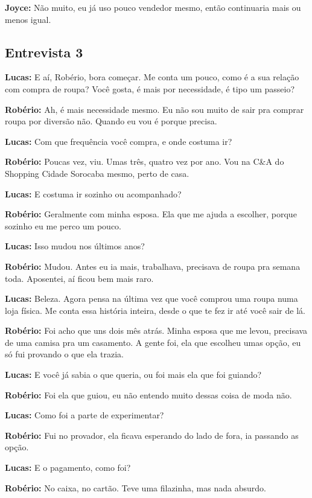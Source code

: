 \textbf{Joyce:} Não muito, eu já uso pouco vendedor mesmo, então continuaria mais ou menos igual.


\subsection*{Entrevista 3}

\textbf{Lucas:} E aí, Robério, bora começar. Me conta um pouco, como é a sua relação com compra de roupa? Você gosta, é mais por necessidade, é tipo um passeio?

\textbf{Robério:} Ah, é mais necessidade mesmo. Eu não sou muito de sair pra comprar roupa por diversão não. Quando eu vou é porque precisa.

\textbf{Lucas:} Com que frequência você compra, e onde costuma ir?

\textbf{Robério:} Poucas vez, viu. Umas três, quatro vez por ano. Vou na C\&A do Shopping Cidade Sorocaba mesmo, perto de casa.

\textbf{Lucas:} E costuma ir sozinho ou acompanhado?

\textbf{Robério:} Geralmente com minha esposa. Ela que me ajuda a escolher, porque sozinho eu me perco um pouco.

\textbf{Lucas:} Isso mudou nos últimos anos?

\textbf{Robério:} Mudou. Antes eu ia mais, trabalhava, precisava de roupa pra semana toda. Aposentei, aí ficou bem mais raro.

\textbf{Lucas:} Beleza. Agora pensa na última vez que você comprou uma roupa numa loja física. Me conta essa história inteira, desde o que te fez ir até você sair de lá.

\textbf{Robério:} Foi acho que uns dois mês atrás. Minha esposa que me levou, precisava de uma camisa pra um casamento. A gente foi, ela que escolheu umas opção, eu só fui provando o que ela trazia.

\textbf{Lucas:} E você já sabia o que queria, ou foi mais ela que foi guiando?

\textbf{Robério:} Foi ela que guiou, eu não entendo muito dessas coisa de moda não.

\textbf{Lucas:} Como foi a parte de experimentar?

\textbf{Robério:} Fui no provador, ela ficava esperando do lado de fora, ia passando as opção.

\textbf{Lucas:} E o pagamento, como foi?

\textbf{Robério:} No caixa, no cartão. Teve uma filazinha, mas nada absurdo.

